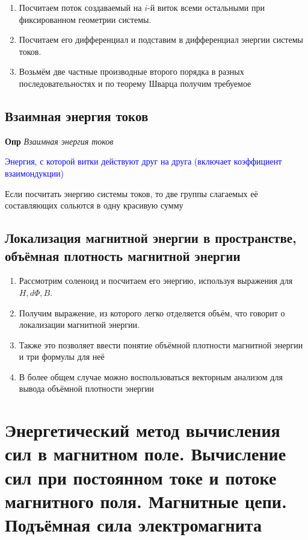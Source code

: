 \documentclass[a4paper, 14pt]{article}
\begin{document}
    \begin{enumerate}
        \item Посчитаем поток создаваемый на $i$-й виток всеми остальными при фиксированном геометрии системы.
        \item Посчитаем его дифференциал и подставим в дифференциал энергии системы токов.
        \item Возьмём две частные производные второго порядка в разных последовательностях и по теорему Шварца
        получим требуемое
    \end{enumerate}
    
    \subsection{Взаимная энергия токов}
    
    \textbf{Опр} \textit{Взаимная энергия токов}
    
    \textcolor{blue}{Энергия, с которой витки действуют друг на друга (включает коэффициент взаимондукции)}
    
    Если посчитать энергию системы токов, то две группы слагаемых её составляющих сольются в одну красивую сумму
    
    \subsection{Локализация магнитной энергии в пространстве, объёмная плотность магнитной энергии}
    
    \begin{enumerate}
        \item Рассмотрим соленоид и посчитаем его энергию, используя выражения для $H, d \Phi, B$.
        \item Получим выражение, из которого легко отделяется объём, что говорит о локализации магнитной энергии.
        \item Также это позволяет ввести понятие объёмной плотности магнитной энергии и три формулы для неё
        \item В более общем случае можно воспользоваться векторным анализом для вывода объёмной плотности энергии
    \end{enumerate}
    
    \section{Энергетический метод вычисления сил в магнитном поле.
    Вычисление сил при постоянном токе и потоке магнитного поля.
    Магнитные цепи.
    Подъёмная сила электромагнита}
    
\end{document}
